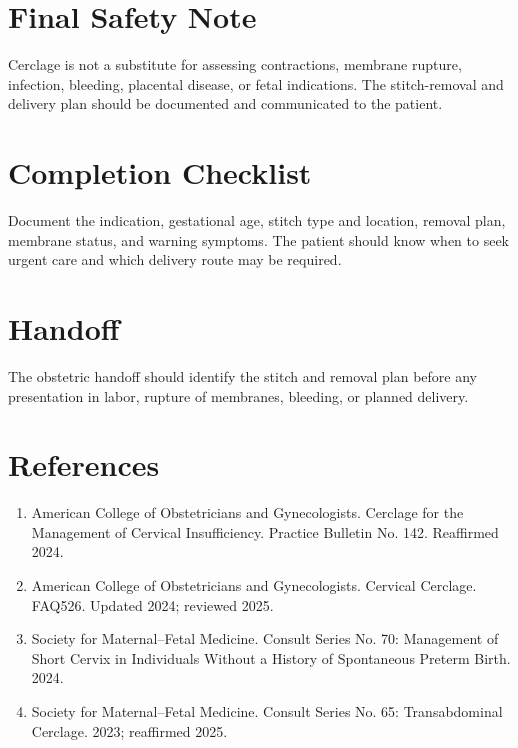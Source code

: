 \section*{Final Safety Note}
Cerclage is not a substitute for assessing contractions, membrane rupture, infection, bleeding, placental disease, or fetal indications. The stitch-removal and delivery plan should be documented and communicated to the patient.

\section*{Completion Checklist}
Document the indication, gestational age, stitch type and location, removal plan, membrane status, and warning symptoms. The patient should know when to seek urgent care and which delivery route may be required.

\section*{Handoff}
The obstetric handoff should identify the stitch and removal plan before any presentation in labor, rupture of membranes, bleeding, or planned delivery.

\section*{References}
\begin{enumerate}
  \item American College of Obstetricians and Gynecologists. Cerclage for the Management of Cervical Insufficiency. Practice Bulletin No. 142. Reaffirmed 2024.
  \item American College of Obstetricians and Gynecologists. Cervical Cerclage. FAQ526. Updated 2024; reviewed 2025.
  \item Society for Maternal--Fetal Medicine. Consult Series No. 70: Management of Short Cervix in Individuals Without a History of Spontaneous Preterm Birth. 2024.
  \item Society for Maternal--Fetal Medicine. Consult Series No. 65: Transabdominal Cerclage. 2023; reaffirmed 2025.
\end{enumerate}

\clearpage
